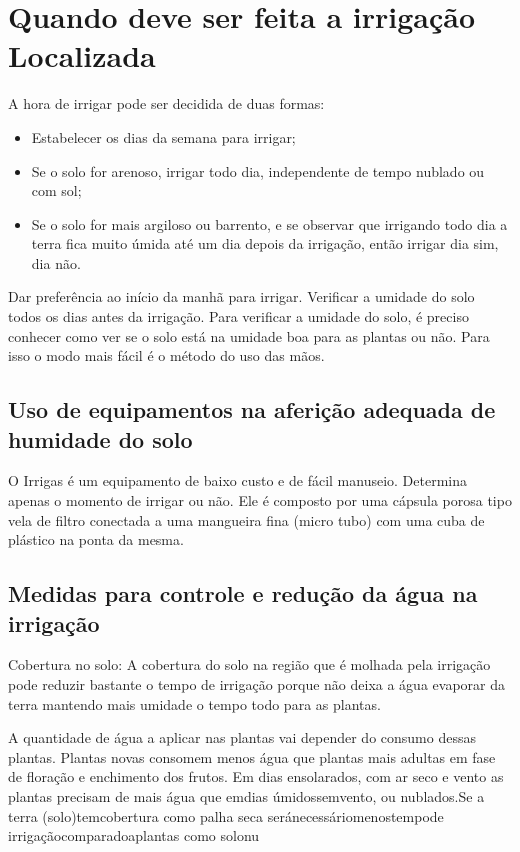 \section{Quando deve ser feita a irriga\c{c}\~ao Localizada}

\cite{COELHO2017} A hora de irrigar pode ser decidida de duas formas:
\begin{itemize}
	\item Estabelecer os dias da semana para irrigar;
	\item Se o solo for arenoso, irrigar todo dia, independente de tempo nublado ou com sol;
	\item Se o solo for mais argiloso ou barrento, e se observar que irrigando todo dia a terra fica muito úmida até um dia depois da irrigação, então irrigar dia sim, dia não. 
\end{itemize}

Dar preferência ao início da manhã para irrigar. Verificar a umidade do solo todos os
dias antes da irrigação. Para verificar a umidade do solo, é preciso conhecer como ver se
o solo está na umidade boa para as plantas ou não. Para isso o modo mais fácil é o método
do uso das mãos.


\subsection{Uso de equipamentos na aferição adequada de humidade do solo}
O Irrigas é um equipamento de baixo custo e de fácil manuseio. Determina apenas
o momento de irrigar ou não. Ele é composto por uma cápsula porosa tipo vela de filtro
conectada a uma mangueira fina (micro tubo) com uma cuba de plástico na ponta
da mesma.


\subsection{Medidas para controle e redução da água na irrigação}
	Cobertura no solo: A cobertura do solo na região que é
	molhada pela irrigação pode reduzir bastante o tempo de irrigação porque não deixa a
	água evaporar da terra mantendo mais umidade o tempo todo para as plantas. 

	A quantidade de água a aplicar nas plantas vai depender do consumo dessas plantas.
	Plantas novas consomem menos água que plantas mais adultas em fase de floração e
	enchimento dos frutos. Em dias ensolarados, com ar seco e vento as plantas precisam de
	mais água que emdias úmidossemvento, ou nublados.Se a terra (solo)temcobertura como
	palha seca seránecessáriomenostempode irrigaçãocomparadoaplantas como solonu